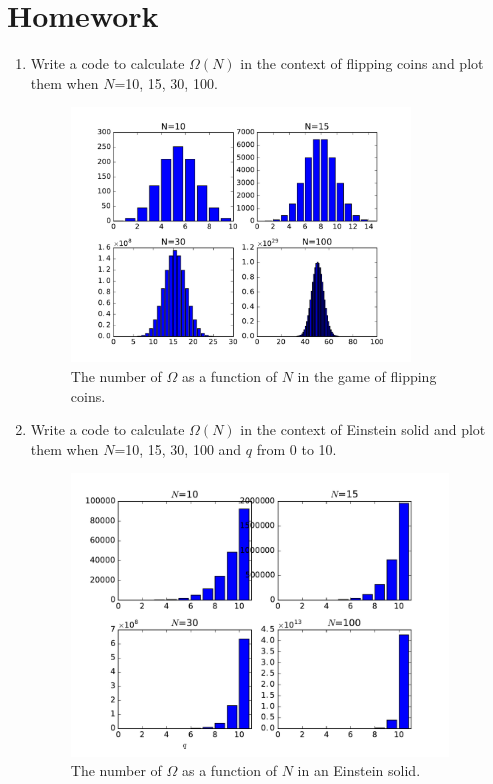 \documentclass[twoside]{article}
\newcounter{lecnum}
\newcommand{\lecture}[5]{
   \pagestyle{myheadings}
   \thispagestyle{plain}
   \newpage
   \setcounter{lecnum}{#1}
   \setcounter{page}{1}
   \noindent
   \begin{center}
   \framebox{
      \vbox{\vspace{2mm}
    \hbox to 6.28in { {\bf Physics 467/667: Thermodynamics/Statistical Physics
	\hfill Spring 2017} }
       \vspace{4mm}
       \hbox to 6.28in { {\Large \hfill Lecture #1: #2  \hfill} }
       \vspace{2mm}
       \hbox to 6.28in { {\it Lecturer: #3 \hfill Scribes: #4} }
      \vspace{2mm}}
   }
   \end{center}
   \markboth{Lecture #1: #2}{Lecture #1: #2}
   \vspace*{4mm}
}
\begin{document}

\section*{Homework}
\begin{enumerate}
\item Write a code to calculate $\Omega(N)$ in the context of flipping coins and plot them when $N$=10, 15, 30, 100.
\begin{figure}[h]
\centering
\includegraphics[width=9cm]{imgs/flip}
\caption{The number of $\Omega$ as a function of $N$ in the game of flipping coins. }
\end{figure}



\item Write a code to calculate $\Omega(N)$ in the context of Einstein solid and plot them when $N$=10, 15, 30, 100 and $q$ from 0 to 10.
\begin{figure}[h]
\centering
\includegraphics[width=10cm]{imgs/Einstein0}
\caption{The number of $\Omega$ as a function of $N$ in an Einstein solid. }
\end{figure}


\end{enumerate}
\end{document}
